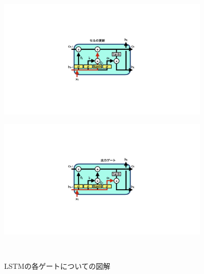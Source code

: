 \begin{figure}[h]
  \begin{minipage}{1.0\textwidth}
  \centering
   \begin{minipage}{0.48\textwidth}
   \centering
    \includegraphics[trim = 600 300 600 300, width=0.9\textwidth, clip]{Figure/2DeepLearning/14CellUpdate.png}
    \label{14CellUpdate}
   \end{minipage}
   \begin{minipage}{0.48\textwidth}
   \centering
    \includegraphics[trim = 600 300 600 300, width=0.9\textwidth, clip]{Figure/2DeepLearning/15OutputGate.png}
    \label{15OutputGate}
   \end{minipage}
   \end{minipage}
  \caption{LSTMの各ゲートについての図解}
\end{figure}

